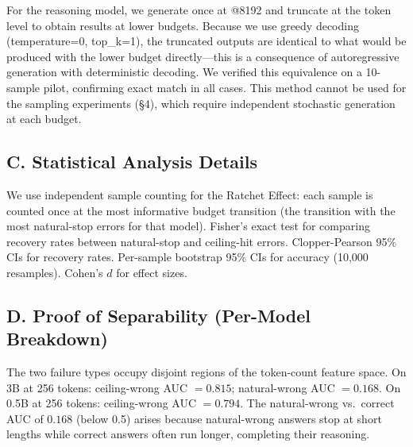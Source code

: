 \documentclass{article}
\begin{document}
For the reasoning model, we generate once at @8192 and truncate at the token level to obtain results at lower budgets. Because we use greedy decoding (temperature=0, top\_k=1), the truncated outputs are identical to what would be produced with the lower budget directly---this is a consequence of autoregressive generation with deterministic decoding. We verified this equivalence on a 10-sample pilot, confirming exact match in all cases. This method cannot be used for the sampling experiments (\S4), which require independent stochastic generation at each budget.

\subsection*{C. Statistical Analysis Details}

We use independent sample counting for the Ratchet Effect: each sample is counted once at the most informative budget transition (the transition with the most natural-stop errors for that model). Fisher's exact test for comparing recovery rates between natural-stop and ceiling-hit errors. Clopper-Pearson 95\% CIs for recovery rates. Per-sample bootstrap 95\% CIs for accuracy (10,000 resamples). Cohen's $d$ for effect sizes.

\subsection*{D. Proof of Separability (Per-Model Breakdown)}

The two failure types occupy disjoint regions of the token-count feature space. On 3B at 256 tokens: ceiling-wrong AUC $= 0.815$; natural-wrong AUC $= 0.168$. On 0.5B at 256 tokens: ceiling-wrong AUC $= 0.794$. The natural-wrong vs.\ correct AUC of $0.168$ (below 0.5) arises because natural-wrong answers stop at short lengths while correct answers often run longer, completing their reasoning.
\end{document}
